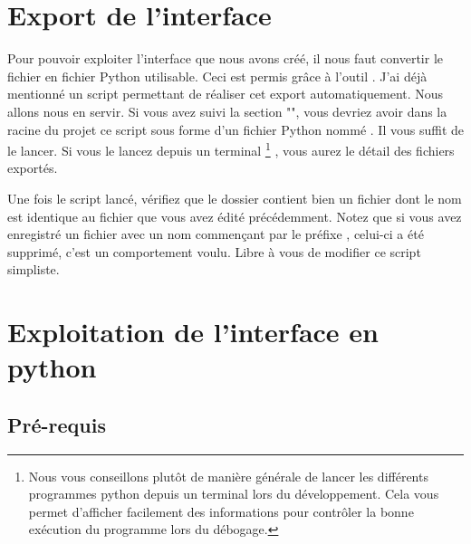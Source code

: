 \documentclass[12pt]{report}    %
\begin{document}

\section{Export de l'interface}

Pour pouvoir exploiter l'interface que nous avons créé, il nous faut convertir le fichier  en fichier Python utilisable.\newline
Ceci est permis grâce à l'outil .\newline
J'ai déjà mentionné un script permettant de réaliser cet export automatiquement. Nous allons nous en servir. Si vous avez suivi la section "", vous devriez avoir dans la racine du projet ce script sous forme d'un fichier Python nommé . Il vous suffit de le lancer. Si vous le lancez depuis un terminal
\footnote
{
Nous vous conseillons plutôt de manière générale de lancer les différents programmes python depuis un terminal lors du développement. Cela vous permet d'afficher facilement des informations pour contrôler la bonne exécution du programme lors du débogage.
}
, vous aurez le détail des fichiers exportés.\newline


Une fois le script lancé, vérifiez que le dossier  contient bien un fichier dont le nom est identique au fichier  que vous avez édité précédemment. Notez que si vous avez enregistré un fichier avec un nom commençant par le préfixe , celui-ci a été supprimé, c'est un comportement voulu. Libre à vous de modifier ce script simpliste.



\section{Exploitation de l'interface en python}

\subsection{Pré-requis}
\end{document}
